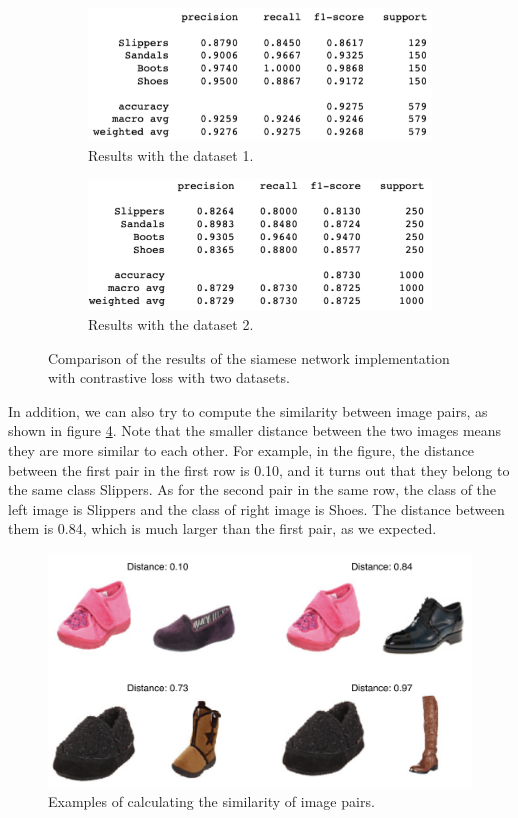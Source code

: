 \begin{figure}[h]
  \centering
  \begin{subfigure}[b]{\linewidth}
  \includegraphics[width=\linewidth]{figs/sia_con_data1.png}
  \caption{Results with the dataset 1.}
  \label{fig:sia_con_data1}
  \end{subfigure}
  \hfill
   \begin{subfigure}[b]{\linewidth}
   \includegraphics[width=\linewidth]{figs/sia_con_data2.png}
   \caption{Results with the dataset 2.}
   \label{fig:sia_con_data2}
  \end{subfigure}
    \hfill
    \caption{Comparison of the results of the siamese network implementation with contrastive loss with two datasets.}
    \label{fig:sia_con_data}
\end{figure}

In addition, we can also try to compute the similarity between image pairs, as shown in figure \ref{fig:similarity}. Note that the smaller distance between the two images means they are more similar to each other. For example, in the figure, the distance between the first pair in the first row is 0.10, and it turns out that they belong to the same class Slippers. As for the second pair in the same row, the class of the left image is Slippers and the class of right image is Shoes. The distance between them is 0.84, which is much larger than the first pair, as we expected. 

\begin{figure}[h]
  \centering
  \includegraphics[width=\linewidth]{figs/similarity.png}
  \caption{Examples of calculating the similarity of image pairs.}
  \label{fig:similarity}
\end{figure}


